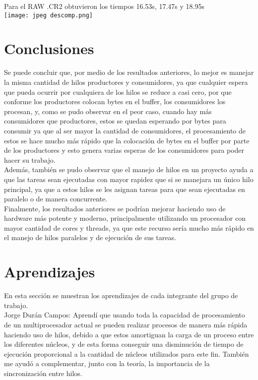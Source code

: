 \documentclass[12pt, article, natbib]{IEEEtran}
\begin{document}
Para el RAW .CR2 obtuvieron los tiempos 16.53s, 17.47s y 18.95s\\

\texttt{[image: jpeg descomp.png]}\\

\section{Conclusiones}
Se puede concluir que, por medio de los resultados anteriores, lo mejor es manejar la misma cantidad de hilos productores y consumidores, ya que cualquier espera que pueda ocurrir por cualquiera de los hilos se reduce a casi cero, por que conforme los productores colocan bytes en el buffer, los consumidores los procesan, y, como se pudo observar en el peor caso, cuando hay más consumidores que productores, estos se quedan esperando por bytes para consumir ya que al ser mayor la cantidad de consumidores, el procesamiento de estos se hace mucho más rápido que la colocación de bytes en el buffer por parte de los productores y esto genera varias esperas de los consumidores para poder hacer su trabajo.\\

Además, también se pudo observar que el manejo de hilos en un proyecto ayuda a que las tareas sean ejecutadas con mayor rapidez que si se manejara un único hilo principal, ya que a estos hilos se les asignan tareas para que sean ejecutadas en paralelo o de manera concurrente.\cite{portfoliocourses_2022_introduction} \\

Finalmente, los resultados anteriores se podrían mejorar haciendo uso de hardware más potente y moderno, principalmente utilizando un procesador con mayor cantidad de cores y threads, ya que este recurso sería mucho más rápido en el manejo de hilos paralelos y de ejecución de sus tareas.\\

\section{Aprendizajes}
En esta sección se muestran los aprendizajes de cada integrante del grupo de trabajo.\\

Jorge Durán Campos: Aprendí que usando toda la capacidad de procesamiento de un multiprocesador actual se pueden realizar procesos de manera más rápida haciendo uso de hilos, debido a que estos amortiguan la carga de un proceso entre los diferentes núcleos, y de esta forma conseguir una disminución de tiempo de ejecución proporcional a la cantidad de núcleos utilizados para este fin. También me ayudó a complementar, junto con la teoría, la importancia de la sincronización entre hilos.\\
\end{document}
